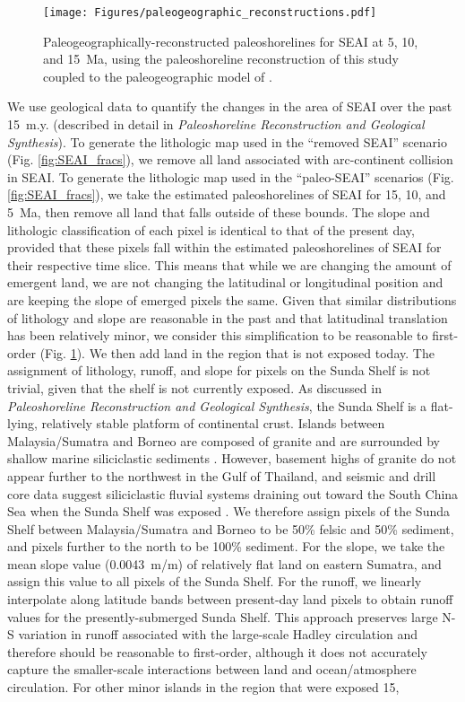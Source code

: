 \documentclass[11pt,letterpaper]{article}
\begin{document}
\begin{figure}[h!]
    \centering
    \texttt{[image: Figures/paleogeographic\_reconstructions.pdf]}
    \caption{Paleogeographically-reconstructed paleoshorelines for SEAI at 5, 10, and 15~Ma, using the paleoshoreline reconstruction of this study coupled to the paleogeographic model of \citet{Matthews2016a}.}
    \label{fig:paleogeographic_reconstructions}
\end{figure}

We use geological data to quantify the changes in the area of SEAI over the past 15~m.y. (described in detail in \textit{Paleoshoreline Reconstruction and Geological Synthesis}). To generate the lithologic map used in the ``removed SEAI'' scenario (Fig. \ref{fig:SEAI_fracs}), we remove all land associated with arc-continent collision in SEAI. To generate the lithologic map used in the ``paleo-SEAI'' scenarios (Fig. \ref{fig:SEAI_fracs}), we take the estimated paleoshorelines of SEAI for 15, 10, and 5~Ma, then remove all land that falls outside of these bounds. The slope and lithologic classification of each pixel is identical to that of the present day, provided that these pixels fall within the estimated paleoshorelines of SEAI for their respective time slice. This means that while we are changing the amount of emergent land, we are not changing the latitudinal or longitudinal position and are keeping the slope of emerged pixels the same. Given that similar distributions of lithology and slope are reasonable in the past and that latitudinal translation has been relatively minor, we consider this simplification to be reasonable to first-order (Fig. \ref{fig:paleogeographic_reconstructions}). We then add land in the region that is not exposed today. The assignment of lithology, runoff, and slope for pixels on the Sunda Shelf is not trivial, given that the shelf is not currently exposed. As discussed in \textit{Paleoshoreline Reconstruction and Geological Synthesis}, the Sunda Shelf is a flat-lying, relatively stable platform of continental crust. Islands between Malaysia/Sumatra and Borneo are composed of granite and are surrounded by shallow marine siliciclastic sediments \citep{Darmadi2007a, Hall2009a, Hall2013b}. However, basement highs of granite do not appear further to the northwest in the Gulf of Thailand, and seismic and drill core data suggest siliciclastic fluvial systems draining out toward the South China Sea when the Sunda Shelf was exposed \citep{Darmadi2007a}. We therefore assign pixels of the Sunda Shelf between Malaysia/Sumatra and Borneo to be 50\% felsic and 50\% sediment, and pixels further to the north to be 100\% sediment. For the slope, we take the mean slope value (0.0043~m/m) of relatively flat land on eastern Sumatra, and assign this value to all pixels of the Sunda Shelf. For the runoff, we linearly interpolate along latitude bands between present-day land pixels to obtain runoff values for the presently-submerged Sunda Shelf. This approach preserves large N-S variation in runoff associated with the large-scale Hadley circulation and therefore should be reasonable to first-order, although it does not accurately capture the smaller-scale interactions between land and ocean/atmosphere circulation. For other minor islands in the region that were exposed 15, 
\end{document}
